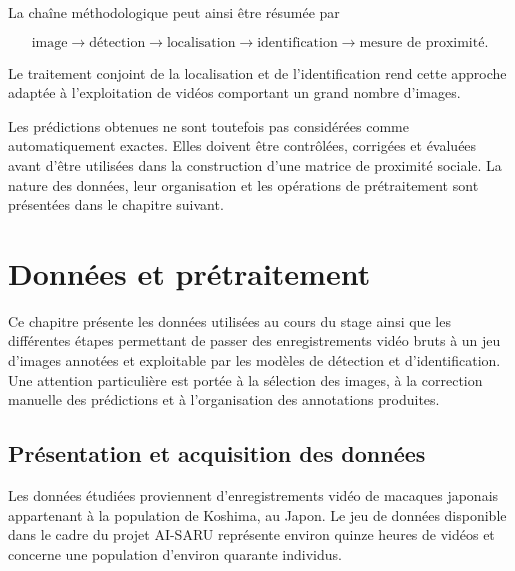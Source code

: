 \documentclass[11pt,a4paper]{report}
\begin{document}
La chaîne méthodologique peut ainsi être résumée par

\begin{equation}
    \text{image}
    \longrightarrow
    \text{détection}
    \longrightarrow
    \text{localisation}
    \longrightarrow
    \text{identification}
    \longrightarrow
    \text{mesure de proximité}.
\end{equation}

Le traitement conjoint de la localisation et de l'identification rend cette
approche adaptée à l'exploitation de vidéos comportant un grand nombre
d'images.

Les prédictions obtenues ne sont toutefois pas considérées comme
automatiquement exactes. Elles doivent être contrôlées, corrigées et évaluées
avant d'être utilisées dans la construction d'une matrice de proximité sociale.
La nature des données, leur organisation et les opérations de prétraitement
sont présentées dans le chapitre suivant.


\chapter{Données et prétraitement}
\label{chap:donnees}

Ce chapitre présente les données utilisées au cours du stage ainsi que les
différentes étapes permettant de passer des enregistrements vidéo bruts à un
jeu d'images annotées et exploitable par les modèles de détection et
d'identification. Une attention particulière est portée à la sélection des
images, à la correction manuelle des prédictions et à l'organisation des
annotations produites.

\section{Présentation et acquisition des données}

Les données étudiées proviennent d'enregistrements vidéo de macaques japonais
appartenant à la population de Koshima, au Japon. Le jeu de données disponible
dans le cadre du projet AI-SARU représente environ quinze heures de vidéos et
concerne une population d'environ quarante individus.
\end{document}
